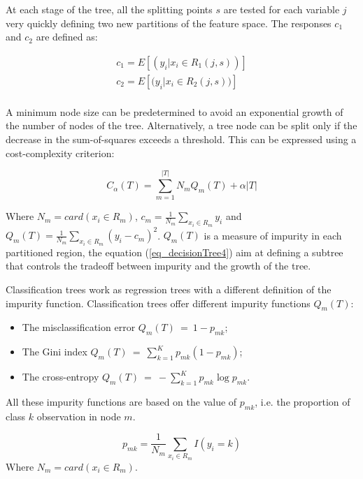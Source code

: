 At each stage of the tree, all the splitting points $s$ are tested for each variable $j$ very quickly defining two new partitions of the feature space. The responses $c_1$ and $c_2$ are defined as:

\begin{equation}
\begin{split}
        c_1=E[(y_i|x_i\in R_1\left(j,s\right))]\\
        c_2=E[{(y}_i|x_i\in R_2\left(j,s\right))]\\
\end{split}
\label{eq_decisionTree3}
\end{equation}

A minimum node size can be predetermined to avoid an exponential growth of the number of nodes of the tree. Alternatively, a tree node can be split only if the decrease in the sum-of-squares exceeds a threshold. This can be expressed using a cost-complexity criterion:

\begin{equation}
        C_\alpha\left(T\right)=\sum_{m=1}^{\left|T\right|}{N_mQ_m\left(T\right)+\alpha\left|T\right|}
        \label{eq_decisionTree4}
\end{equation}

Where $N_m=card(x_i\in R_m)$, $c_m=\frac{1}{N_m}\sum_{x_i\in R_m} y_i$ and $Q_m\left(T\right)=\frac{1}{N_m}\sum_{x_i\in R_m}\left(y_i-c_m\right)^2$. $Q_m\left(T\right)$ is a measure of impurity in each partitioned region, the equation (\ref{eq_decisionTree4}) aim at defining a subtree that controls the tradeoff between impurity and the growth of the tree.\par

Classification trees work as regression trees with a different definition of the impurity function. Classification trees offer different impurity functions $Q_m(T)$:
\begin{itemize}
    \item The misclassification error $Q_m(T)\ =\ 1-p_{mk}$;
    \item The Gini index $Q_m(T)\ =\ \sum_{k=1}^{K}{p_{mk}(1-p_{mk})}$;
    \item The cross-entropy $Q_m(T)\ =\ -\sum_{k=1}^{K}{p_{mk}\log{p_{mk}}}$.
\end{itemize}

All these impurity functions are based on the value of $p_{mk}$, i.e. the proportion of class $k$ observation in node $m$.

\begin{equation}
        p_{mk}=\frac{1}{N_m}\sum_{x_i\in R_m}{I(y_i=k)}
        \label{eq_decisionTree5}
\end{equation}
Where $N_m=card(x_i\in R_m)$.\par 

